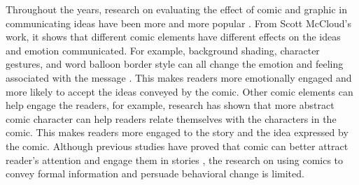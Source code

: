 Throughout the years, research on evaluating the effect of comic and graphic in communicating ideas have been more and more popular \cite{McDermottPB18,cary2004going,scott1993understanding,weaver2017losing,matsubara2016emotional}. From Scott McCloud's work, it shows that different comic elements have different effects on the ideas and emotion communicated. For example, background shading, character gestures, and word balloon border style can all change the emotion and feeling associated with the message \cite{scott1993understanding,mccloud2011making}. This makes readers more emotionally engaged and more likely to accept the ideas conveyed by the comic. Other comic elements can help engage the readers, for example, research has shown that more abstract comic character can help readers relate themselves with the characters in the comic. This makes readers more engaged to the story and the idea expressed by the comic. Although previous studies have proved that comic can better attract reader's attention and engage them in stories \cite{scott1993understanding,mccloud2011making,McDermottPB18}, the research on using comics to convey formal information and persuade behavioral change is limited.
